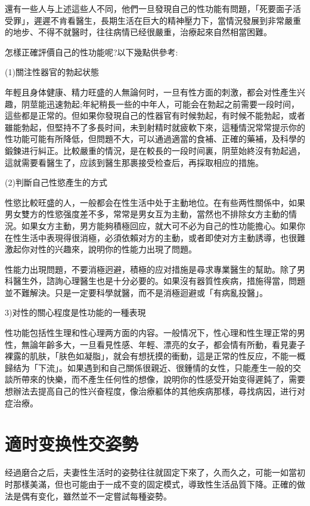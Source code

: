 \documentclass[12pt,UTF8]{ctexbook}
\begin{document}
還有一些人与上述這些人不同，他們一旦發現自己的性功能有問題，「死要面子活受罪」，遲遲不肯看醫生，長期生活在巨大的精神壓力下，當情況發展到非常嚴重的地步、不得不就醫时，往往病情已经很嚴重，治療起來自然相當困難。

怎樣正確評價自己的性功能呢?以下幾點供參考:

(1)關注性器官的勃起状態

年輕且身体健康、精力旺盛的人無論何时，一旦有性方面的刺激，都会对性產生兴趣，阴莖能迅速勃起;年紀稍長一些的中年人，可能会在勃起之前需要一段时间，這些都是正常的。但如果你發現自己的性器官有时候勃起，有时候不能勃起，或者雖能勃起，但堅持不了多長时间，未到射精时就疲軟下來，這種情況常常提示你的性功能可能有所降低，但問題不大，可以通過適當的食補、正確的藥補，及科學的鍛鍊进行糾正。比較嚴重的情況，是在較長的一段时间裏，阴莖始終沒有勃起過，這就需要看醫生了，应該到醫生那裹接受检查后，再採取相应的措施。

(2)判斷自己性慾產生的方式

性慾比較旺盛的人，一般都会在性生活中处于主動地位。在有些两性關係中，如果男女雙方的性慾强度差不多，常常是男女互为主動，當然也不排除女方主動的情況。如果女方主動，男方能夠積極回应，就大可不必为自己的性功能擔心。如果你在性生活中表現得很消極，必須依賴对方的主動，或者即使对方主動誘導，也很難激起你对性的兴趣來，說明你的性能力出現了問題。

性能力出現問題，不要消極迥避，積極的应对措施是尋求專業醫生的幫助。除了男科醫生外，諮詢心理醫生也是十分必要的。如果沒有器質性疾病，措施得當，問題並不難解決。只是一定要科學就醫，而不是消極迴避或「有病亂投醫」。

3)对性的關心程度是性功能的一種表現

性功能包括性生理和性心理两方面的内容。一般情况下，性心理和性生理正常的男性，無論年齡多大，一旦看見性感、年輕、漂亮的女子，都会情有所動，看見妻子裸露的肌肤，「肤色如凝脂」，就会有想抚摸的衝動，這是正常的性反应，不能一概歸结为「下流」。如果遇到和自己關係很親近、很鍾情的女性，只能產生一般的交談所帶來的快樂，而不產生任何性的想像，說明你的性感受开始变得遲鈍了，需要想辦法去提高自己的性兴奋程度，像治療軀体的其他疾病那樣，尋找病因，进行对症治療。

\section{適时变换性交姿勢}

经過磨合之后，夫妻性生活时的姿勢往往就固定下來了，久而久之，可能一如當初时那樣美滿，但也可能由于一成不变的固定模式，導致性生活品質下降。正確的做法是偶有变化，雖然並不一定嘗試每種姿勢。
\end{document}
